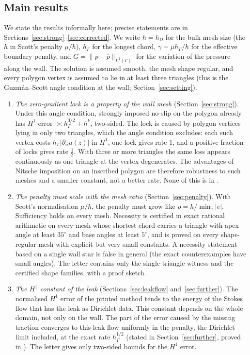 \documentclass[pdflatex,sn-mathphys-num]{sn-jnl}
\theoremstyle{thmstyleone}
\theoremstyle{thmstylethree}
\newcommand{\hG}{h_\Gamma}
\newcommand{\hO}{h_\Omega}
\newcommand{\dn}{\partial_n}
\newcommand{\pbar}{\bar p}
\newcommand{\norm}[1]{\lVert #1\rVert}
\begin{document}
\subsection{Main results}
We state the results informally here; precise statements are in Sections~\ref{sec:strong}--\ref{sec:corrected}. We write $h=\hO$ for the bulk mesh size (the $h$ in Scott's penalty $\mu/h$), $\hG$ for the longest chord, $\gamma=\mu\hG/h$ for the effective boundary penalty, and $G=\norm{p-\pbar}_{L^2(\Gamma)}$ for the variation of the pressure along the wall. The solution is assumed smooth, the mesh shape regular, and every polygon vertex is assumed to lie in at least three triangles (this is the Guzm\'an--Scott angle condition at the wall; Section~\ref{sec:setting}).
\begin{enumerate}[label=(\arabic*)]
\item \emph{The zero-gradient lock is a property of the wall mesh} (Section~\ref{sec:strong}). Under this angle condition, strongly imposed no-slip on the polygon already has $H^1$ error $\asymp\hG^{3/2}+h^k$, two-sided. The lock is caused by polygon vertices lying in only two triangles, which the angle condition excludes: each such vertex costs $\hG|\dn u(z)|$ in $H^1$, one lock gives rate $1$, and a positive fraction of locks gives rate $\frac12$. With three or more triangles the same loss appears continuously as one triangle at the vertex degenerates. The advantages of Nitsche imposition on an inscribed polygon are therefore robustness to such meshes and a smaller constant, not a better rate. None of this is in \cite{CavalcantePadhiLetter}.
\item \emph{The penalty must scale with the mesh ratio} (Section~\ref{sec:penalty}). With Scott's normalisation $\mu/h$, the penalty must grow like $\rho=h/\min_e|e|$. Sufficiency holds on every mesh. Necessity is certified in exact rational arithmetic on every mesh whose shortest chord carries a triangle with apex angle at least $35^\circ$ and base angles at least $5^\circ$, and is proved on every shape-regular mesh with explicit but very small constants. A necessity statement based on a single wall star is false in general (the exact counterexamples have small angles). The letter \cite{CavalcantePadhiLetter} contains only the single-triangle witness and the certified shape families, with a proof sketch.
\item \emph{The $H^1$ constant of the leak} (Sections~\ref{sec:leakflow} and~\ref{sec:further}). The normalised $H^1$ error of the printed method tends to the energy of the Stokes flow that has the leak as Dirichlet data. This constant depends on the whole domain, not only on the wall. The part of the error caused by the missing traction converges to this leak flow uniformly in the penalty, the Dirichlet limit included, at the exact rate $\hG^{1/2}$ (stated in Section~\ref{sec:further}, proved in \cite{PadhiExt}). The letter gives only two-sided bounds for the $H^1$ error.

\end{enumerate}
\end{document}
